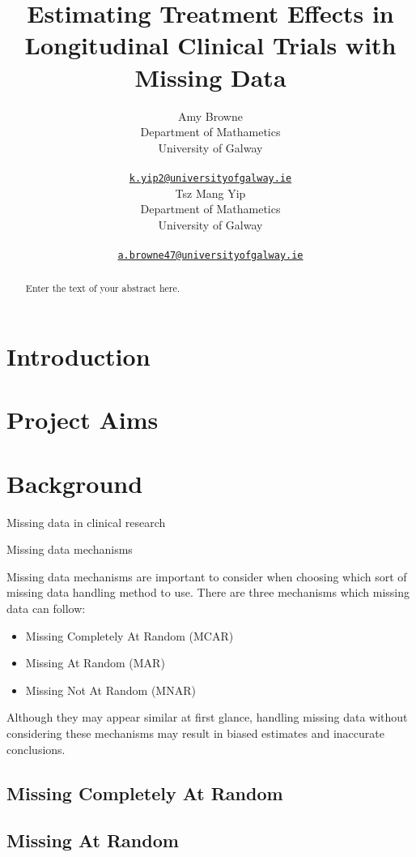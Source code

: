 \documentclass{article}
\title{Estimating Treatment Effects in Longitudinal Clinical Trials with
Missing Data}
\author{
    Amy Browne
   \\
    Department of Mathametics \\
    University of Galway \\
   \\
  \texttt{\href{mailto:k.yip2@universityofgalway.ie}{\nolinkurl{k.yip2@universityofgalway.ie}}} \\
   \And
    Tsz Mang Yip
   \\
    Department of Mathametics \\
    University of Galway \\
   \\
  \texttt{\href{mailto:a.browne47@universityofgalway.ie}{\nolinkurl{a.browne47@universityofgalway.ie}}} \\
  }
\providecommand{\tightlist}{%
  \setlength{\itemsep}{0pt}\setlength{\parskip}{0pt}}
\begin{document}
\maketitle


\begin{abstract}
Enter the text of your abstract here.
\end{abstract}


\section{Introduction}\label{introduction}

\section{Project Aims}\label{project-aims}

\section{Background}\label{background}

Missing data in clinical research

Missing data mechanisms

Missing data mechanisms are important to consider when choosing which
sort of missing data handling method to use. There are three mechanisms
which missing data can follow:

\begin{itemize}
\tightlist
\item
  Missing Completely At Random (MCAR)
\item
  Missing At Random (MAR)
\item
  Missing Not At Random (MNAR)
\end{itemize}

Although they may appear similar at first glance, handling missing data
without considering these mechanisms may result in biased estimates and
inaccurate conclusions.

\subsection{Missing Completely At
Random}\label{missing-completely-at-random}

\subsection{Missing At Random}\label{missing-at-random}
\end{document}
